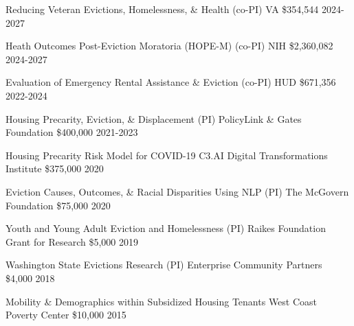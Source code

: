 



\begin{cvhonors}

  \cvhonor
    {Reducing Veteran Evictions, Homelessness, \& Health (co-PI)} %
    {VA} %
    {\$354,544} %
    {2024-2027} %
    
  \cvhonor
    {Heath Outcomes Post-Eviction Moratoria (HOPE-M) (co-PI)} %
    {NIH} %
    {\$2,360,082} %
    {2024-2027} %
    
  \cvhonor
    {Evaluation of Emergency Rental Assistance \& Eviction (co-PI)} %
    {HUD} %
    {\$671,356} %
    {2022-2024} %

  \cvhonor
    {Housing Precarity, Eviction, \& Displacement (PI)} %
    {PolicyLink \& Gates Foundation} %
    {\$400,000} %
    {2021-2023} %

  \cvhonor
    {Housing Precarity Risk Model for COVID-19} %
    {C3.AI Digital Transformations Institute} %
    {\$375,000} %
    {2020} %

  \cvhonor
    {Eviction Causes, Outcomes, \& Racial Disparities Using NLP (PI)} %
    {The McGovern Foundation} %
    {\$75,000} %
    {2020} %

  \cvhonor
    {Youth and Young Adult Eviction and Homelessness (PI)} %
    {Raikes Foundation Grant for Research} %
    {\$5,000} %
    {2019} %

  \cvhonor
    {Washington State Evictions Research (PI)} %
    {Enterprise Community Partners} %
    {\$4,000} %
    {2018} %

   \cvhonor
    {Mobility \& Demographics within Subsidized Housing Tenants} %
    {West Coast Poverty Center} %
    {\$10,000} %
    {2015} %
\end{cvhonors}


